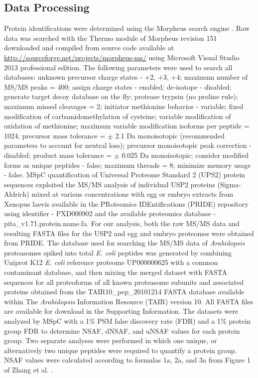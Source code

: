 \subsection{Data Processing}

Protein identifications were determined using the Morpheus search engine \citep{wenger13}.  Raw data was searched with the Thermo module of Morpheus revision 151 downloaded and compiled from source code available at \url{http://sourceforge.net/projects/morpheus-ms/} using Microsoft Visual Studio 2013 professional edition.  The following parameters were used to search all databases: unknown precursor charge states - +2, +3, +4; maximum number of MS/MS peaks = 400; assign charge states - enabled; de-isotope - disabled; generate target decoy database on the fly; protease trypsin (no proline rule); maximum missed cleavages = 2; initiator methionine behavior - variable; fixed modification of carbamidomethylation of cysteine; variable modification of oxidation of methionine; maximum variable modification isoforms per peptide = 1024; precursor mass tolerance = $\pm$ 2.1 Da monoisotopic (recommended parameters to account for neutral loss); precursor monoisotopic peak correction - disabled; product mass tolerance = $\pm$ 0.025 Da monoisotopic; consider modified forms as unique peptides - false; maximum threads = 8; minimize memory usage - false.   
MSpC quantification of Universal Proteome Standard 2 (UPS2) protein sequences exploited the MS/MS analysis of individual USP2 proteins (Sigma-Aldrich) mixed at various concentrations with egg or embryo extracts from Xenopus laevis available in the PRoteomics IDEntifications (PRIDE) repository \citep{vizcaino13} using identifier - PXD000902 and the available proteomics database - pita\_v1.71.protein.name.fa.  For our analysis, both the raw MS/MS data and resulting FASTA files for the USP2 and egg and embryo proteomes were obtained from PRIDE.  The database used for searching the MS/MS data of \textit{Arabidopsis} proteasomes spiked into total \textit{E. coli} peptides was generated by combining Uniprot K12 \textit{E. coli} reference proteome UP000000625 with a common contaminant database, and then mixing the merged dataset with FASTA sequences for all proteoforms of all known proteasome subunits and associated proteins \citep{book10} obtained from the TAIR10\_pep\_20101214 FASTA database available within The \textit{Arabidopsis} Information Resource (TAIR) version 10.  All FASTA files are available for download in the Supporting Information.  The datasets were analyzed by MSpC with a 1\% PSM false discovery rate (FDR) and a 1\% protein group FDR to determine NSAF, dNSAF, and uNSAF values for each protein group. Two separate analyses were performed in which one unique, or alternatively two unique peptides were required to quantify a protein group.  NSAF values were calculated according to formulas 1a, 2a, and 3a from Figure 1 of Zhang et al. \citep{zhang10}.


